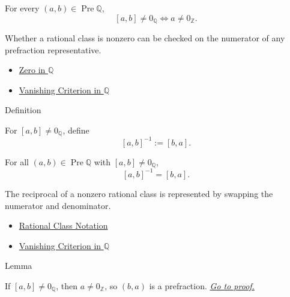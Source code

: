 \begin{remark*}
For every $(a,b)\in\operatorname{Pre}\mathbb{Q}$,
\[
[a,b]\ne 0_{\mathbb{Q}}
\Longleftrightarrow
a\ne 0_{\mathbb{Z}}.
\]
\end{remark*}

\begin{remark*}[Interpretation]
Whether a rational class is nonzero can be checked on the numerator of any
prefraction representative.
\end{remark*}

\begin{dependencies}
\begin{itemize}
  \item \hyperref[def:zero-in-q]{Zero in $\mathbb{Q}$}
  \item \hyperref[lem:vanishing-criterion-q]{Vanishing Criterion in $\mathbb{Q}$}
\end{itemize}
\end{dependencies}

\begin{definitionbox}{Definition}
\begin{definition}
\label{def:reciprocal-on-q-classes}
For $[a,b]\ne 0_{\mathbb{Q}}$, define
\[
[a,b]^{-1}:=[b,a].
\]
\end{definition}
\end{definitionbox}

\begin{remark*}
For all $(a,b)\in\operatorname{Pre}\mathbb{Q}$ with $[a,b]\ne 0_{\mathbb{Q}}$,
\[
[a,b]^{-1}=[b,a].
\]
\end{remark*}

\begin{remark*}[Interpretation]
The reciprocal of a nonzero rational class is represented by swapping the
numerator and denominator.
\end{remark*}

\begin{dependencies}
\begin{itemize}
  \item \hyperref[def:rational-class-notation]{Rational Class Notation}
  \item \hyperref[lem:vanishing-criterion-q]{Vanishing Criterion in $\mathbb{Q}$}
\end{itemize}
\end{dependencies}

\begin{lemmabox}{Lemma}
\begin{lemma}
\label{lem:reciprocal-denominator-nonzero-q}
If $[a,b]\ne 0_
{\mathbb{Q}}$, then $a\ne 0_{\mathbb{Z}}$, so $(b,a)$ is a
prefraction.
\hyperref[prf:reciprocal-denominator-nonzero-q]{\textit{Go to proof.}}
\end{lemma}
\end{lemmabox}

